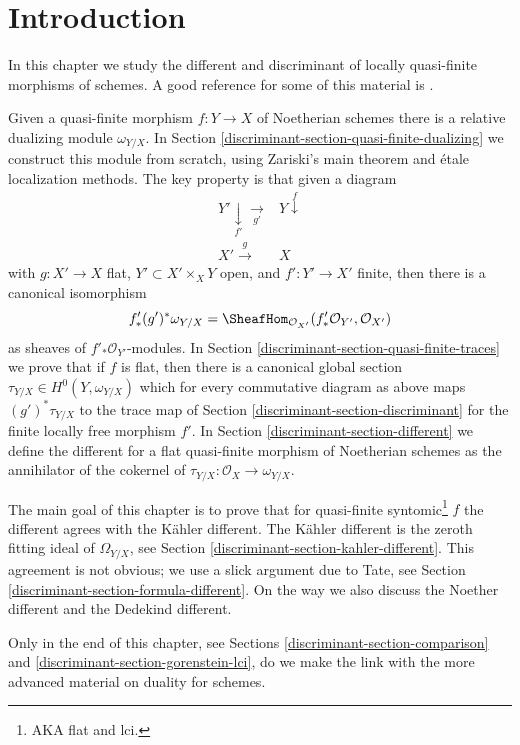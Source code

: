 \section{Introduction}
\label{discriminant-section-introduction}
In this chapter we study the different and discriminant
of locally quasi-finite morphisms of schemes.
A good reference for some of this material is \cite{Kunz}.

\medskip\noindent
Given a quasi-finite morphism $f : Y \to X$ of Noetherian schemes
there is a relative dualizing module $\omega_{Y/X}$.
In Section \ref{discriminant-section-quasi-finite-dualizing}
we construct this module from scratch, using
Zariski's main theorem and \'etale localization methods.
The key property is that given a diagram
$$
\begin{array}{cc}Y' \underset{f'}{\downarrow}\underset{g'}{\longrightarrow} & Y \overset{f}{\downarrow} \\ X' \overset{g}{\longrightarrow} & X\end{array}
$$
with $g : X' \to X$ flat, $Y' \subset X' \times_X Y$ open, and
$f' : Y' \to X'$ finite, then there is a canonical isomorphism
$$
f'_*(g')^*\omega_{Y/X} =
\SheafHom_{\mathcal{O}_{X'}}(f'_*\mathcal{O}_{Y'}, \mathcal{O}_{X'})
$$
as sheaves of $f'_*\mathcal{O}_{Y'}$-modules. In
Section \ref{discriminant-section-quasi-finite-traces} we prove that
if $f$ is flat, then there is a canonical global section
$\tau_{Y/X} \in H^0(Y, \omega_{Y/X})$ which for every commutative
diagram as above maps $(g')^*\tau_{Y/X}$ to the trace map
of Section \ref{discriminant-section-discriminant}
for the finite locally free morphism $f'$.
In Section \ref{discriminant-section-different}
we define the different for a flat quasi-finite
morphism of Noetherian schemes as the annihilator of the
cokernel of $\tau_{Y/X} : \mathcal{O}_X \to \omega_{Y/X}$.

\medskip\noindent
The main goal of this chapter is to prove that for
quasi-finite syntomic\footnote{AKA flat and lci.} $f$ the
different agrees with the K\"ahler different.
The K\"ahler different is the zeroth fitting ideal of $\Omega_{Y/X}$, see
Section \ref{discriminant-section-kahler-different}.
This agreement is not obvious; we use a slick argument
due to Tate, see Section \ref{discriminant-section-formula-different}.
On the way we also discuss the Noether different
and the Dedekind different.

\medskip\noindent
Only in the end of this chapter, see
Sections \ref{discriminant-section-comparison} and \ref{discriminant-section-gorenstein-lci},
do we make the link with the more advanced material
on duality for schemes.

